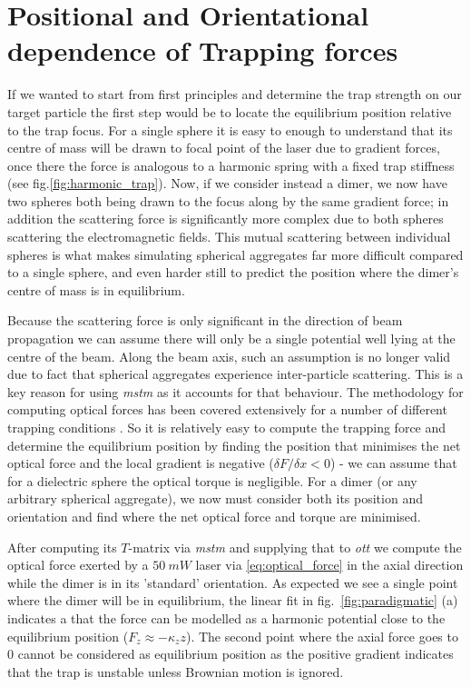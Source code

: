 \section{Positional and Orientational dependence of Trapping forces}
\label{sec:eq_positions}
If we wanted to start from first principles and determine 
the trap strength on our target particle the first step 
would be to locate the equilibrium position relative to 
the trap focus. For a single sphere it is easy to enough 
to understand that its centre of mass will be drawn to 
focal point of the laser due to gradient forces, once there 
the force is analogous to a harmonic spring with a fixed 
trap stiffness (see fig.\ref{fig:harmonic_trap}). Now, if 
we consider instead a dimer, we now have two spheres both 
being drawn to the focus along by the same gradient force; 
in addition the scattering force is significantly more complex 
due to both spheres scattering the electromagnetic fields. 
This mutual scattering between individual spheres is what 
makes simulating spherical aggregates far more difficult 
compared to a single sphere, and even harder still to 
predict the position where the dimer's centre of mass is 
in equilibrium.

Because the scattering force is only significant in the 
direction of beam propagation \cite{Capitanio2002} we 
can assume there will only be a single potential well 
lying at the centre of the beam. Along the beam axis, 
such an assumption is no longer valid due to fact that 
spherical aggregates experience inter-particle scattering. 
This is a key reason for using \textit{mstm} as it 
accounts for that behaviour. The methodology for computing 
optical forces has been covered extensively for a number 
of different trapping conditions \cite{RanhaNeves2019}. 
So it is relatively easy to compute the trapping force 
and determine the equilibrium position by finding the 
position that minimises the net optical force and the 
local gradient is negative ($\delta F/\delta x < 0$) - 
we can assume that for a dielectric sphere the optical 
torque is negligible. For a dimer (or any arbitrary 
spherical aggregate), we now must consider both its 
position and orientation and find where the net optical 
force and torque are minimised. 

After computing its $T$-matrix via \textit{mstm} and supplying that 
to \textit{ott} we compute the optical force exerted by a $50\ mW$ laser
via \eqref{eq:optical_force} in the axial direction while the dimer is 
in its 'standard' orientation. As expected we see a single point where 
the dimer will be in equilibrium, the linear fit in fig.~\ref{fig:paradigmatic}
(a) indicates a that the force can be modelled as a harmonic potential close 
to the equilibrium position ($F_z\approx-\kappa_z z$). The second point 
where the axial force goes to 0 cannot be considered as equilibrium position 
as the positive gradient indicates that the trap is unstable unless Brownian 
motion is ignored. 

